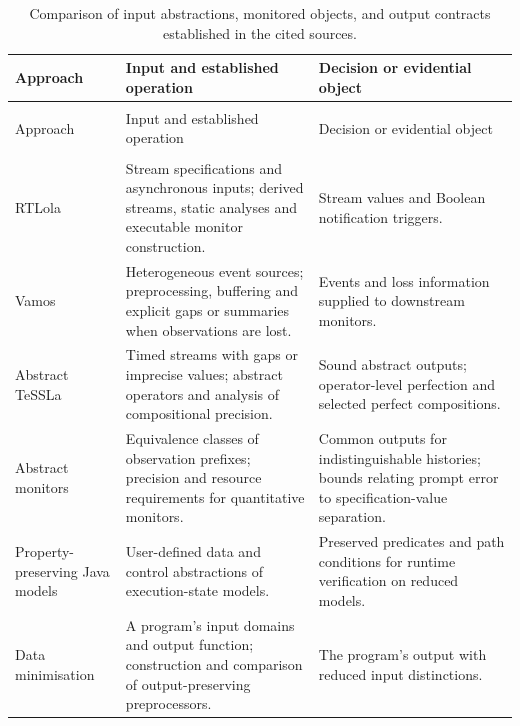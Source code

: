 \documentclass[preprint,11pt]{elsarticle}
\begin{document}
{\small
\setlength{\tabcolsep}{4pt}
\renewcommand{\arraystretch}{1.12}
\setlength{\LTleft}{0pt}
\setlength{\LTright}{0pt}
\begin{longtable}{@{}>{\raggedright\arraybackslash}p{.235\linewidth}>{\raggedright\arraybackslash}p{.38\linewidth}>{\raggedright\arraybackslash}p{}@{}}
\caption{Comparison of input abstractions, monitored objects, and output contracts established in the cited sources.}\label{tab:related-matrix}\\
\toprule
Approach & Input and established operation & Decision or evidential object \\
\midrule
\endfirsthead
\multicolumn{3}{l}{Table~\thetable\ (continued)}\\
\toprule
Approach & Input and established operation & Decision or evidential object \\
\midrule
\endhead
\midrule
\multicolumn{3}{r}{Continued on next page}\\
\endfoot
\bottomrule
\endlastfoot
RTLola \cite{baumeister2026rtlola} & Stream specifications and asynchronous inputs; derived streams, static analyses and executable monitor construction. & Stream values and Boolean notification triggers. \\
Vamos \cite{chalupa2025vamos} & Heterogeneous event sources; preprocessing, buffering and explicit gaps or summaries when observations are lost. & Events and loss information supplied to downstream monitors. \\
Abstract TeSSLa \cite{leucker2019partial} & Timed streams with gaps or imprecise values; abstract operators and analysis of compositional precision. & Sound abstract outputs; operator-level perfection and selected perfect compositions. \\
Abstract monitors \cite{henzinger2022abstract} & Equivalence classes of observation prefixes; precision and resource requirements for quantitative monitors. & Common outputs for indistinguishable histories; bounds relating prompt error to specification-value separation. \\
Property-preserving Java models \cite{jevitha2024abstract} & User-defined data and control abstractions of execution-state models. & Preserved predicates and path conditions for runtime verification on reduced models. \\
Data minimisation \cite{antignac2017minimisation} & A program's input domains and output function; construction and comparison of output-preserving preprocessors. & The program's output with reduced input distinctions. \\

\end{longtable}}
\end{document}
